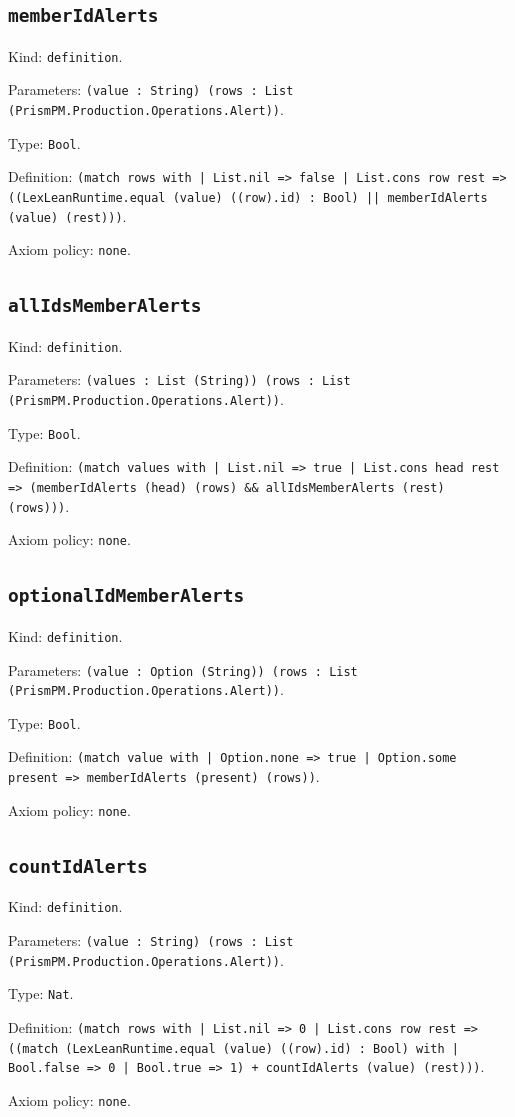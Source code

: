 \documentclass[11pt]{article}
\begin{document}
\subsection*{\texttt{memberIdAlerts}}
\noindent Kind: \texttt{definition}.\par
\noindent Parameters: \texttt{(value : String) (rows : List (PrismPM.Production.Operations.Alert))}.\par
\noindent Type: \texttt{Bool}.\par
\noindent Definition: \texttt{(match rows with | List.nil => false | List.cons row rest => ((LexLeanRuntime.equal (value) ((row).id) : Bool) || memberIdAlerts (value) (rest)))}.\par
\noindent Axiom policy: \texttt{none}.\par
\subsection*{\texttt{allIdsMemberAlerts}}
\noindent Kind: \texttt{definition}.\par
\noindent Parameters: \texttt{(values : List (String)) (rows : List (PrismPM.Production.Operations.Alert))}.\par
\noindent Type: \texttt{Bool}.\par
\noindent Definition: \texttt{(match values with | List.nil => true | List.cons head rest => (memberIdAlerts (head) (rows) \&\& allIdsMemberAlerts (rest) (rows)))}.\par
\noindent Axiom policy: \texttt{none}.\par
\subsection*{\texttt{optionalIdMemberAlerts}}
\noindent Kind: \texttt{definition}.\par
\noindent Parameters: \texttt{(value : Option (String)) (rows : List (PrismPM.Production.Operations.Alert))}.\par
\noindent Type: \texttt{Bool}.\par
\noindent Definition: \texttt{(match value with | Option.none => true | Option.some present => memberIdAlerts (present) (rows))}.\par
\noindent Axiom policy: \texttt{none}.\par
\subsection*{\texttt{countIdAlerts}}
\noindent Kind: \texttt{definition}.\par
\noindent Parameters: \texttt{(value : String) (rows : List (PrismPM.Production.Operations.Alert))}.\par
\noindent Type: \texttt{Nat}.\par
\noindent Definition: \texttt{(match rows with | List.nil => 0 | List.cons row rest => ((match (LexLeanRuntime.equal (value) ((row).id) : Bool) with | Bool.false => 0 | Bool.true => 1) + countIdAlerts (value) (rest)))}.\par
\noindent Axiom policy: \texttt{none}.\par
\end{document}
